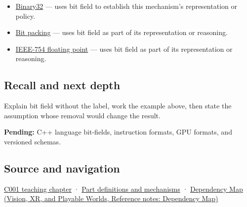 \hypertarget{appendix-ac697f5c66e8-used-by}{}

\begin{itemize}
\item
  \hyperref[appendix-5057f9ad327f]{Binary32} --- uses bit field to establish this mechanism's representation or policy.
\item
  \hyperref[appendix-1f9963e1a5d1]{Bit packing} --- uses bit field as part of its representation or reasoning.
\item
  \hyperref[appendix-343615f49ddf]{IEEE-754 floating point} --- uses bit field as part of its representation or reasoning.
\end{itemize}

\subsection{Recall and next depth}\label{appendix-ac697f5c66e8-recall-and-next-depth}

\hypertarget{appendix-ac697f5c66e8-recall-and-next-depth}{}

Explain bit field without the label, work the example above, then state the assumption whose removal would change the result.

\textbf{Pending:} C++ language bit-fields, instruction formats, GPU formats, and versioned schemas.

\subsection{Source and navigation}\label{appendix-ac697f5c66e8-source-and-navigation}

\hypertarget{appendix-ac697f5c66e8-source-and-navigation}{}

\hyperref[01-foundations-i-ch001-from-a-signal-to-an-interpretation]{C001 teaching chapter} · \hyperref[appendix-fd090d982a15]{Part definitions and mechanisms} · \href{../07-Vision-XR-and-Playable-Worlds/main.pdf\#nameddest=appendix-4ad47bdd269a}{Dependency Map (Vision, XR, and Playable Worlds, Reference notes: Dependency Map)}
